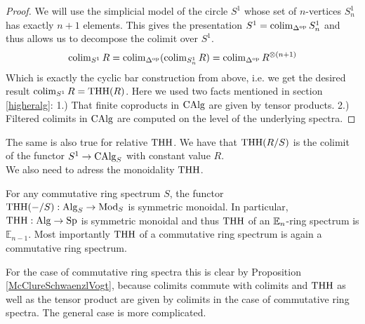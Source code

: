 \begin{proof}
    We will use the simplicial model of the circle $S^1$ whose set of $n$-vertices $S_n^1$ has exactly $n+1$ elements. This gives the presentation $S^1=\operatorname{colim}_{\Delta^{\operatorname{op}}}S_n^1$ and thus allows us to decompose the colimit over $S^1$.
    \begin{equation*}
        \operatorname{colim}_{S^1}R=\operatorname{colim}_{\Delta^{\operatorname{op}}}(\operatorname{colim}_{S_n^1}R)=\operatorname{colim}_{\Delta^{\operatorname{op}}}R^{\otimes(n+1)}
    \end{equation*} 
    Which is exactly the cyclic bar construction from above, i.e. we get the desired result $\operatorname{colim}_{S^1}R=\operatorname{THH}(R)$. Here we used two facts mentioned in section \ref{higheralg}: 1.) That finite coproducts in $\operatorname{CAlg}$ are given by tensor products. 2.) Filtered colimits in $\operatorname{CAlg}$ are computed on the level of the underlying spectra.
\end{proof}
The same is also true for relative $\operatorname{THH}$. We have that $\operatorname{THH}(R/S)$ is the colimit of the functor $S^1\rightarrow \operatorname{CAlg}_S$ with constant value $R$.
\\
We also need to adress the monoidality $\operatorname{THH}$.
\begin{prop}
    For any commutative ring spectrum $S$, the functor \\ $\operatorname{THH}(-/S): \operatorname{Alg}_S\rightarrow \operatorname{Mod}_S$ is symmetric monoidal. In particular, $\operatorname{THH}:\operatorname{Alg}\to \operatorname{Sp}$ is symmetric monoidal and thus $\operatorname{THH}$ of an $\mathbb{E}_n$-ring spectrum is $\mathbb{E}_{n-1}$. Most importantly $\operatorname{THH}$ of a commutative ring spectrum is again a commutative ring spectrum.
\end{prop}
For the case of commutative ring spectra this is clear by Proposition \ref{McClureSchwaenzlVogt}, because colimits commute with colimits and $\operatorname{THH}$ as well as the tensor product are given by colimits in the case of commutative ring spectra. The general case is more complicated.

